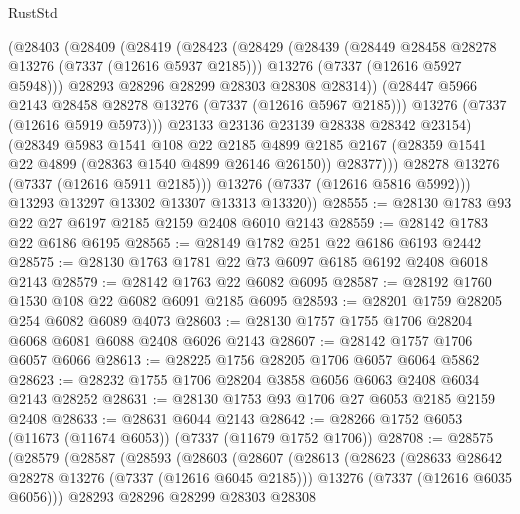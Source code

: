 \begin{lexlean}{RustStd}
\begin{coremodule}
              (@28403
                (@28409
                  (@28419
                    (@28423
                      (@28429
                        (@28439
                          (@28449 @28458 @28278 @13276 (@7337 (@12616 @5937 @2185)))
                          @13276
                          (@7337 (@12616 @5927 @5948)))
                        @28293
                        @28296
                        @28299
                        @28303
                        @28308
                        @28314))
                    (@28447 @5966 @2143 @28458 @28278 @13276 (@7337 (@12616 @5967 @2185)))
                    @13276
                    (@7337 (@12616 @5919 @5973)))
                  @23133
                  @23136
                  @23139
                  @28338
                  @28342
                  @23154)
                (@28349
                  @5983
                  @1541
                  @108
                  @22
                  @2185
                  @4899
                  @2185
                  @2167
                  (@28359 @1541 @22 @4899 (@28363 @1540 @4899 @26146 @26150))
                  @28377)))
            @28278
            @13276
            (@7337 (@12616 @5911 @2185)))
          @13276
          (@7337 (@12616 @5816 @5992)))
        @13293
        @13297
        @13302
        @13307
        @13313
        @13320))
@28555 := @28130 @1783 @93 @22 @27 @6197 @2185 @2159 @2408 @6010 @2143
@28559 := @28142 @1783 @22 @6186 @6195
@28565 := @28149 @1782 @251 @22 @6186 @6193 @2442
@28575 := @28130 @1763 @1781 @22 @73 @6097 @6185 @6192 @2408 @6018 @2143
@28579 := @28142 @1763 @22 @6082 @6095
@28587 := @28192 @1760 @1530 @108 @22 @6082 @6091 @2185 @6095
@28593 := @28201 @1759 @28205 @254 @6082 @6089 @4073
@28603 := @28130 @1757 @1755 @1706 @28204 @6068 @6081 @6088 @2408 @6026 @2143
@28607 := @28142 @1757 @1706 @6057 @6066
@28613 := @28225 @1756 @28205 @1706 @6057 @6064 @5862
@28623 := @28232 @1755 @1706 @28204 @3858 @6056 @6063 @2408 @6034 @2143 @28252
@28631 := @28130 @1753 @93 @1706 @27 @6053 @2185 @2159 @2408
@28633 := @28631 @6044 @2143
@28642 := @28266 @1752 @6053 (@11673 (@11674 @6053)) (@7337 (@11679 @1752 @1706))
@28708 := @28575
    (@28579
      (@28587
        (@28593
          (@28603
            (@28607
              (@28613
                (@28623
                  (@28633 @28642 @28278 @13276 (@7337 (@12616 @6045 @2185)))
                  @13276
                  (@7337 (@12616 @6035 @6056)))
                @28293
                @28296
                @28299
                @28303
                @28308

\end{coremodule}
\end{lexlean}
